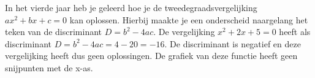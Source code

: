 \documentclass{ximera}
\begin{document}
    
    



In het vierde jaar heb je geleerd hoe je de tweedegraadsvergelijking \(ax^2 + bx + c = 0\) kan oplossen. 
Hierbij maakte je een onderscheid naargelang het teken van de discriminant \(D = b^2 - 4ac\).
De vergelijking \(x^2 + 2x + 5 = 0\) heeft als discriminant \(D = b^2 - 4ac = 4 - 20 = -16\). 
De discriminant is negatief en deze vergelijking heeft dus geen oplossingen. 
De grafiek van deze functie heeft geen snijpunten met de x-as. 
\end{document}
